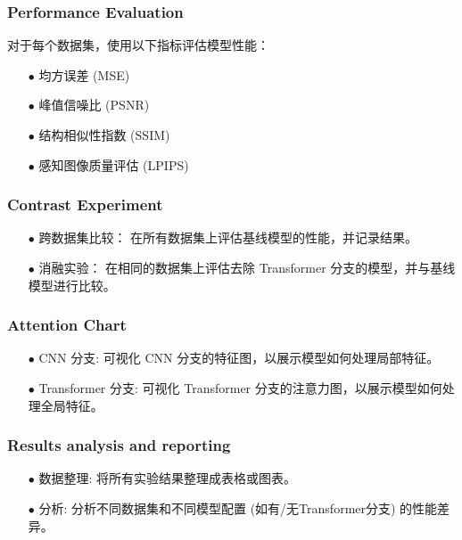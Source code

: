 \documentclass[a4paper, 10pt]{article}
\begin{document}
		\subsubsection{Performance Evaluation}
		
		对于每个数据集，使用以下指标评估模型性能：
		
		\begin{itemize}
			\item[$\bullet$]
			均方误差 (MSE)
			\item[$\bullet$]
			峰值信噪比 (PSNR)
			\item[$\bullet$]
			结构相似性指数 (SSIM)
			\item[$\bullet$]
			感知图像质量评估 (LPIPS)
		\end{itemize}
		
		\subsubsection{Contrast Experiment}
		
		\begin{itemize}
			\item[$\bullet$]
			跨数据集比较： 在所有数据集上评估基线模型的性能，并记录结果。
			\item[$\bullet$]
			消融实验： 在相同的数据集上评估去除 Transformer 分支的模型，并与基线模型进行比较。
		\end{itemize}
				
		\subsubsection{Attention Chart}
		
		\begin{itemize}
			\item[$\bullet$]
			CNN 分支: 可视化 CNN 分支的特征图，以展示模型如何处理局部特征。
			\item[$\bullet$]
			Transformer 分支: 可视化 Transformer 分支的注意力图，以展示模型如何处理全局特征。
		\end{itemize}
				
		\subsubsection{Results analysis and reporting}
		
		\begin{itemize}
			\item[$\bullet$]
			数据整理: 将所有实验结果整理成表格或图表。
			\item[$\bullet$]
			分析: 分析不同数据集和不同模型配置 (如有/无Transformer分支) 的性能差异。
		\end{itemize}
				
\end{document}
